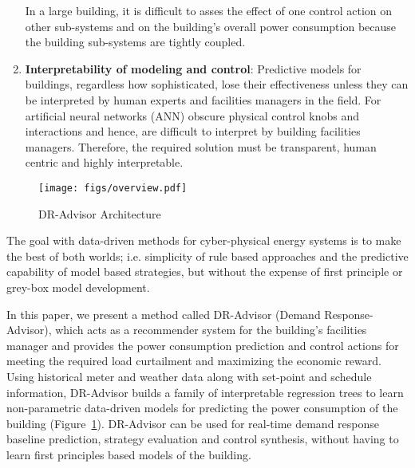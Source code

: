 \documentclass{sig-alternate-ipsn13}
\theoremstyle{definition}
\begin{document}
\begin{enumerate}[leftmargin=0.5cm,topsep=1pt,itemsep=-1ex,partopsep=1ex,parsep=1ex]
In a large building, it is difficult to asses the effect of one control action on other sub-systems and on the building's overall power consumption because the building sub-systems are tightly coupled. 
\item \textbf{Interpretability of modeling and control}: Predictive models for buildings, regardless how sophisticated, lose their effectiveness unless they can be interpreted by human experts and facilities managers in the field.
For \eg artificial neural networks (ANN) obscure physical control knobs and interactions and hence, are difficult to interpret by building facilities managers.
Therefore, the required solution must be transparent, human centric and highly interpretable.
\end{enumerate}

\begin{figure}
\centering
\texttt{[image: figs/overview.pdf]}
\vspace{-3pt}
\caption{DR-Advisor Architecture}
\label{fig:overview}
\vspace{-16pt}
\end{figure}

The goal with data-driven methods for cyber-physical energy systems is to make the best of both worlds; i.e. simplicity of rule based approaches and the predictive capability of model based strategies, but without the expense of first principle or grey-box model development.

In this paper, we present a method called DR-Advisor (Demand Response-Advisor), which acts as a recommender system for the building's facilities manager and provides the power consumption prediction and control actions for meeting the required load curtailment and maximizing the economic reward.  
Using historical meter and weather data along with set-point and schedule information, DR-Advisor builds a family of interpretable regression trees to learn non-parametric data-driven models for predicting the power consumption of the building (Figure~\ref{fig:overview}).
DR-Advisor can be used for real-time demand response baseline prediction, strategy evaluation and control synthesis, without having to learn first principles based models of the building.
\end{document}
